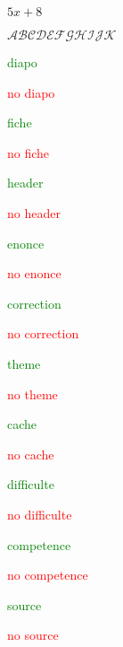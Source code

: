 \documentclass{classe-tex3R-2-1}
\begin{document}
$5x+8 $

$\mathcal{ABCDEFGHIJK}$


\rivdifficulte


\begin{scratch}
\end{scratch}




\ifdiapo \textcolor{green}{diapo}\par \else \hfill \textcolor{red}{no} \textcolor{red}{diapo}\par \fi
\iffiche \textcolor{green}{fiche}\par \else \hfill \textcolor{red}{no} \textcolor{red}{fiche}\par \fi
\ifheader \textcolor{green}{header}\par \else \hfill \textcolor{red}{no} \textcolor{red}{header}\par \fi


\ifenonce \textcolor{green}{enonce}\par \else \hfill \textcolor{red}{no} \textcolor{red}{enonce}\par \fi
\ifcorrection \textcolor{green}{correction}\par \else \hfill \textcolor{red}{no} \textcolor{red}{correction}\par \fi



\iftheme \textcolor{green}{theme}\par \else \hfill \textcolor{red}{no} \textcolor{red}{theme}\par \fi
\ifcache \textcolor{green}{cache}\par \else \hfill \textcolor{red}{no} \textcolor{red}{cache}\par \fi
\ifdifficulte \textcolor{green}{difficulte}\par \else \hfill \textcolor{red}{no} \textcolor{red}{difficulte}\par \fi
\ifcompetence \textcolor{green}{competence}\par \else \hfill \textcolor{red}{no} \textcolor{red}{competence}\par \fi
\ifsource \textcolor{green}{source}\par \else \hfill \textcolor{red}{no} \textcolor{red}{source}\par \fi
\end{document}
